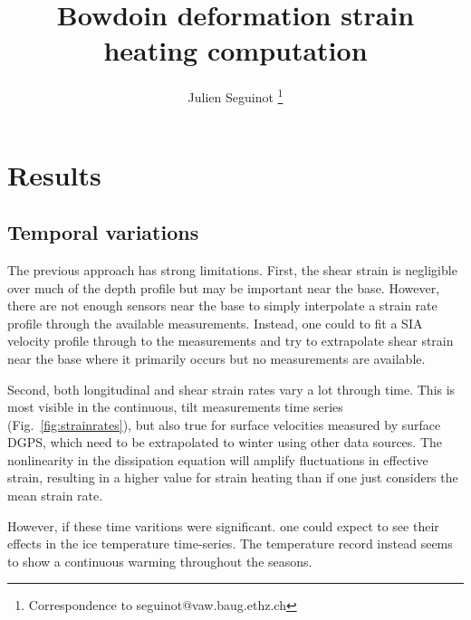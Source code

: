 \documentclass[utf8]{article}
\title{Bowdoin deformation strain heating computation}
\author[1]{Julien Seguinot
           \thanks{Correspondence to seguinot@vaw.baug.ethz.ch}}
\affil[1]{Laboratory of Hydraulics, Hydrology and Glaciology,
          ETH Zürich, Switzerland}
\begin{document}



\section{Results}

\subsection{Temporal variations}

    The previous approach has strong limitations.  First, the shear strain is
    negligible over much of the depth profile but may be important near the
    base. However, there are not enough sensors near the base to simply
    interpolate a strain rate profile through the available measurements.
    Instead, one could to fit a SIA velocity profile through to the
    measurements and try to extrapolate shear strain near the base where it
    primarily occurs but no measurements are available.

    Second, both longitudinal and shear strain rates vary a lot through time.
    This is most visible in the continuous, tilt measurements time series
    (Fig.~\ref{fig:strainrates}), but also true for surface velocities
    measured by surface DGPS, which need to be extrapolated to winter using
    other data sources. The nonlinearity in the dissipation equation will
    amplify fluctuations in effective strain, resulting in a higher value for
    strain heating than if one just considers the mean strain rate.

    However, if these time varitions were significant. one could expect to see
    their effects in the ice temperature time-series. The temperature record
    instead seems to show a continuous warming throughout the seasons.


\end{document}
